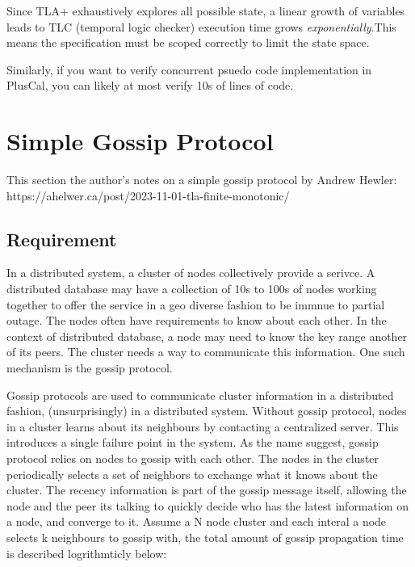\documentclass{report}
\begin{document}
Since TLA+ exhaustively explores all possible state, a linear growth of
variables leads to TLC (temporal logic checker) execution time grows
\textit{exponentially}.This means the specification must be scoped correctly to
limit the state space.\newline

Similarly, if you want to verify concurrent psuedo code implementation in
PlusCal, you can likely at most verify 10s of lines of code.

\chapter{Simple Gossip Protocol}

This section the author's notes on a simple gossip protocol by Andrew Hewler:\newline
https://ahelwer.ca/post/2023-11-01-tla-finite-monotonic/\newline

\section{Requirement}

In a distributed system, a cluster of nodes collectively provide a serivce. A
distributed database may have a collection of 10s to 100s of nodes working
together to offer the service in a geo diverse fashion to be immnue to partial
outage.  The nodes often have requirements to know about each other. In the
context of distributed database, a node may need to know the key range another
of its peers. The cluster needs a way to communicate this information. One such
mechanism is the gossip protocol.

Gossip protocols are used to communicate cluster information in a distributed
fashion, (unsurprisingly) in a distributed system. Without gossip protocol, 
nodes in a cluster learns about its neighbours by contacting a centralized
server. This introduces a single failure point in the system. As the name
suggest, gossip protocol relies on nodes to gossip with each other. The nodes in
the cluster periodically selects a set of neighbors to exchange what it knows
about the cluster. The recency information is part of the gossip message
itself, allowing the node and the peer its talking to quickly decide who has the
latest information on a node, and converge to it. Assume a N node cluster and
each interal a node selects k neighbours to gossip with, the total amount of
gossip propagation time is described logrithmticly below:
\end{document}
